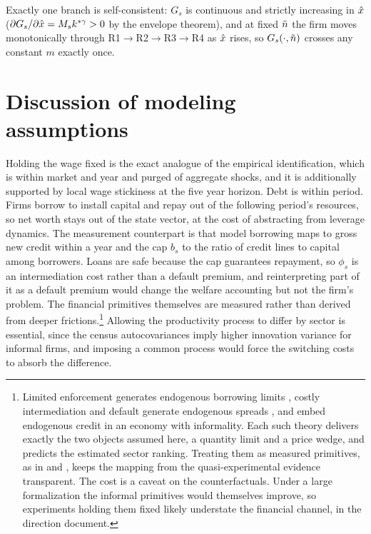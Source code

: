 \documentclass[12pt]{article}
\begin{document}
Exactly one branch is self-consistent: $G_{s}$ is continuous and
strictly increasing in $\hat{x}$
($\partial G_{s}/\partial\hat{x}=M_{s}k^{*\gamma}>0$ by the envelope
theorem), and at fixed $\tilde{n}$ the firm moves monotonically
through R1$\to$R2$\to$R3$\to$R4 as $\hat{x}$ rises, so
$G_{s}(\cdot,\tilde{n})$ crosses any constant $m$ exactly once.

\section{Discussion of modeling assumptions}
\label{sec:gen-discussion}

Holding the wage fixed is the exact analogue of the empirical identification, which is within market and year and purged of aggregate shocks, and it is additionally supported by local wage stickiness at the five year horizon. Debt is within period. Firms borrow to install capital and repay out of the following period's resources, so net worth stays out of the state vector, at the cost of abstracting from leverage dynamics. The measurement counterpart is that model borrowing maps to gross new credit within a year and the cap $b_{s}$ to the ratio of credit lines to capital among borrowers. Loans are safe because the cap guarantees repayment, so $\phi_{s}$ is an intermediation cost rather than a default premium, and reinterpreting part of it as a default premium would change the welfare accounting but not the firm's problem. The financial primitives themselves are measured rather than derived from deeper frictions.\footnote{Limited enforcement generates endogenous borrowing limits \citep{albuquerque2004optimal,clementi2006theory}, costly intermediation and default generate endogenous spreads \citep{cooley2001financial,arellano2012firm}, and \citet{d2012financial} embed endogenous credit in an economy with informality. Each such theory delivers exactly the two objects assumed here, a quantity limit and a price wedge, and predicts the estimated sector ranking. Treating them as measured primitives, as in \citet{midrigan2014finance} and \citet{moll2014productivity}, keeps the mapping from the quasi-experimental evidence transparent. The cost is a caveat on the counterfactuals. Under a large formalization the informal primitives would themselves improve, so experiments holding them fixed likely understate the financial channel, in the direction \citet{brooks2020credit} document.} Allowing the productivity process to differ by sector is essential, since the census autocovariances imply higher innovation variance for informal firms, and imposing a common process would force the switching costs to absorb the difference.
\end{document}
